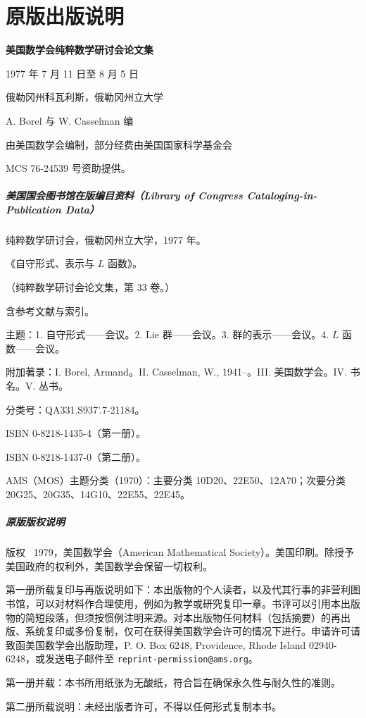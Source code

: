 \chapter*{原版出版说明}
\begin{center}
\textbf{美国数学会纯粹数学研讨会论文集}\par
1977 年 7 月 11 日至 8 月 5 日\par
俄勒冈州科瓦利斯，俄勒冈州立大学\par\medskip
A. Borel 与 W. Casselman 编\par\medskip
由美国数学会编制，部分经费由美国国家科学基金会\par
MCS 76-24539 号资助提供。
\end{center}

\paragraph*{美国国会图书馆在版编目资料（Library of Congress Cataloging-in-Publication Data）}
纯粹数学研讨会，俄勒冈州立大学，1977 年。\par
《自守形式、表示与 $L$ 函数》。\par
（纯粹数学研讨会论文集，第 33 卷。）\par
含参考文献与索引。\par
主题：1. 自守形式——会议。2. Lie 群——会议。3. 群的表示——会议。4. $L$ 函数——会议。\par
附加著录：I. Borel, Armand。II. Casselman, W., 1941--。III. 美国数学会。IV. 书名。V. 丛书。\par
分类号：QA331.S937'.7-21184。\par
ISBN 0-8218-1435-4（第一册）。\par
ISBN 0-8218-1437-0（第二册）。\par
AMS（MOS）主题分类（1970）：主要分类 10D20、22E50、12A70；次要分类 20G25、20G35、14G10、22E55、22E45。

\paragraph*{原版版权说明}
版权 \textcopyright\ 1979，美国数学会（American Mathematical Society）。美国印刷。除授予美国政府的权利外，美国数学会保留一切权利。

第一册所载复印与再版说明如下：本出版物的个人读者，以及代其行事的非营利图书馆，可以对材料作合理使用，例如为教学或研究复印一章。书评可以引用本出版物的简短段落，但须按惯例注明来源。对本出版物任何材料（包括摘要）的再出版、系统复印或多份复制，仅可在获得美国数学会许可的情况下进行。申请许可请致函美国数学会出版助理，P. O. Box 6248, Providence, Rhode Island 02940-6248，或发送电子邮件至 \texttt{reprint-permission@ams.org}。

第一册并载：本书所用纸张为无酸纸，符合旨在确保永久性与耐久性的准则。

第二册所载说明：未经出版者许可，不得以任何形式复制本书。
